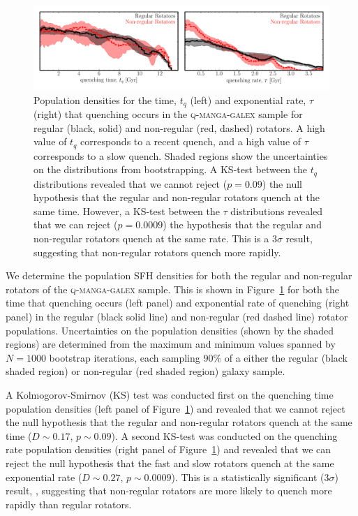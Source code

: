 \documentclass[useAMS,usenatbib]{mn2e}
\begin{document}
\begin{figure}
\centering
\includegraphics[width=\textwidth]{../figures/quenching_time_rate_FR_SR_NSF_C16.pdf}
\caption{Population densities for the time, $t_q$ (left) and exponential rate, $\tau$ (right) that quenching occurs in the \textsc{q-manga-galex} sample for regular (black, solid) and non-regular (red, dashed) rotators. A high value of $t_q$ corresponds to a recent quench, and a high value of $\tau$ corresponds to a slow quench. Shaded regions show the uncertainties on the distributions from bootstrapping. A KS-test between the $t_q$ distributions revealed that we cannot reject ($p=0.09$) the null hypothesis that the regular and non-regular rotators quench at the same time. However, a KS-test between the $\tau$ distributions revealed that we can reject ($p=0.0009$) the hypothesis that the regular and non-regular rotators quench at the same rate. This is a $3\sigma$ result, suggesting that non-regular rotators quench more rapidly.}
\label{fig:popfrvsr}
\end{figure}

We determine the population SFH densities for both the regular and non-regular rotators of the \textsc{q-manga-galex} sample. This is shown in Figure~\ref{fig:popfrvsr} for both the time that quenching occurs (left panel) and exponential rate of quenching (right panel) in the regular (black solid line) and non-regular (red dashed line) rotator populations. Uncertainties on the population densities (shown by the shaded regions) are determined from the maximum and minimum values spanned by $N = 1000$ bootstrap iterations, each sampling $90\%$ of a either the regular (black shaded region) or non-regular (red shaded region) galaxy sample. 

A Kolmogorov-Smirnov (KS) test was conducted first on the quenching time population densities (left panel of Figure~\ref{fig:popfrvsr}) and revealed that we cannot reject the null hypothesis that the regular and non-regular rotators quench at the same time ($D \sim 0.17$, $p \sim 0.09$). A second KS-test was conducted on the quenching rate population densities (right panel of Figure~\ref{fig:popfrvsr}) and revealed that we can reject the null hypothesis that the fast and slow rotators quench at the same exponential rate ($D \sim 0.27$, $p \sim 0.0009$). This is a statistically significant ($3\sigma$) result, , suggesting that non-regular rotators are more likely to quench more rapidly than regular rotators.
\end{document}
